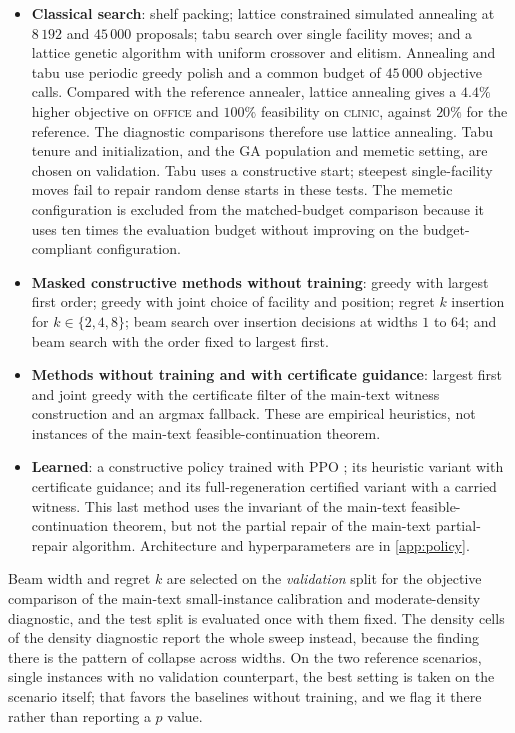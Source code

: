 \documentclass[11pt]{article}
\begin{document}
\begin{itemize}
\item \textbf{Classical search}: shelf packing; lattice constrained simulated
annealing at $8\,192$ and $45\,000$ proposals; tabu search
 over single facility moves; and a lattice genetic
algorithm with uniform crossover and elitism. Annealing and tabu use periodic
greedy polish and a common budget of $45\,000$ objective calls.
Compared with the reference annealer, lattice annealing gives a $4.4\%$
higher objective on \textsc{office} and $100\%$ feasibility on \textsc{clinic},
against $20\%$ for the reference. The diagnostic comparisons therefore use
lattice annealing. Tabu tenure and initialization, and the GA population and
memetic setting, are chosen on validation. Tabu uses a constructive start;
steepest single-facility moves fail to repair random dense starts in these
tests. The memetic configuration is excluded from the matched-budget
comparison because it uses ten times the evaluation budget without improving
on the budget-compliant configuration.
\item \textbf{Masked constructive methods without training}: greedy with largest first
order; greedy with joint choice of facility and position; regret $k$ insertion for
$k\in\{2,4,8\}$; beam search over insertion decisions at widths $1$ to $64$; and
beam search with the order fixed to largest first.
\item \textbf{Methods without training and with certificate guidance}: largest first and joint greedy
with the certificate filter of the main-text witness construction and an argmax fallback.
These are empirical heuristics, not instances of the main-text feasible-continuation theorem.
\item \textbf{Learned}: a constructive policy trained with PPO
\citep{Schulman2017PPO}; its heuristic variant with certificate guidance; and its
full-regeneration certified variant with a carried witness. This last method uses
the invariant of the main-text feasible-continuation theorem, but not the partial repair of
the main-text partial-repair algorithm. Architecture and hyperparameters are in
\ref{app:policy}.
\end{itemize}

Beam width and regret $k$ are selected on the \emph{validation} split for the
objective comparison of the main-text small-instance calibration and moderate-density diagnostic, and the test split is
evaluated once with them fixed. The density cells of
the density diagnostic report the whole sweep instead, because the
finding there is the pattern of collapse across widths. On the two reference
scenarios, single instances with no validation counterpart, the best setting
is taken on the scenario itself; that favors the baselines without training, and
we flag it there rather than reporting a $p$ value.
\end{document}
